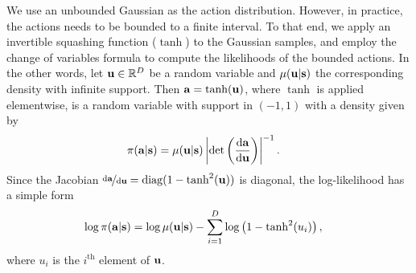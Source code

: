 We use an unbounded Gaussian as the action distribution. However, in practice, the actions needs to be bounded to a finite interval. To that end, we
apply an invertible squashing function 
($\tanh$) to the Gaussian samples, and employ the change of variables formula to compute the likelihoods of the bounded actions. In the other words, let $\mathbf{u}\in\mathbb{R}^D$ be a random variable and $\mu(\mathbf{u}|\mathbf{s})$ the corresponding density with infinite support. Then $\mathbf{a} = \tanh(\mathbf{u})$, where $\tanh$ is applied elementwise, is a random variable with support in $(-1, 1)$ with a density given by
\begin{align}
\pi (\mathbf{a}|\mathbf{s}) &= \mu(\mathbf{u}|\mathbf{s})\left|\det \left(\frac{\mathrm{d}\mathbf{a}}{\mathrm{d}\mathbf{u}} \right)\right|^{-1}.
\end{align}
Since the Jacobian $\nicefrac{\mathrm{d}\mathbf{a}}{\mathrm{d}\mathbf{u}} = \mathrm{diag}(1 - \tanh^2(\mathbf{u}))$ is diagonal, the log-likelihood has a simple form 
\begin{align}
\log\pi (\mathbf{a}|\mathbf{s}) &= \log \mu(\mathbf{u}|\mathbf{s}) - \sum_{i=1}^D\log\left(1 - \tanh^2(u_i)\right),
\end{align}
where $u_i$ is the $i^\mathrm{th}$ element of $\mathbf{u}$.







